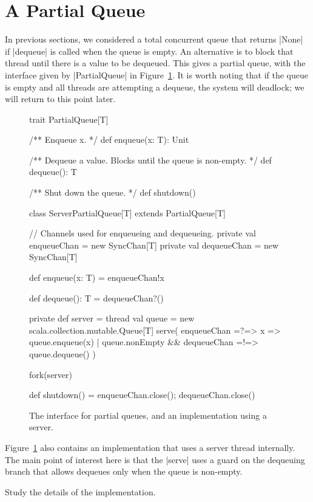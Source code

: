 \section{A Partial Queue}

In previous sections, we considered a total concurrent queue that returns
|None| if |dequeue| is called when the queue is empty.  
%
An alternative is to block that thread until there is a value to be dequeued.
This gives a partial queue, with the interface given by |PartialQueue| in
Figure~\ref{fig:partial-queue}.  It is worth noting that if the queue is empty
and all threads are attempting a dequeue, the system will deadlock; we will
return to this point later.


\begin{figure}
\begin{scala}
trait PartialQueue[T]{
  /** Enqueue x. */
  def enqueue(x: T): Unit

  /** Dequeue a value.  Blocks until the queue is non-empty. */
  def dequeue(): T

  /** Shut down the queue. */
  def shutdown()
}

class ServerPartialQueue[T] extends PartialQueue[T]{
  // Channels used for enqueueing and dequeueing.
  private val enqueueChan = new SyncChan[T]
  private val dequeueChan = new SyncChan[T]

  def enqueue(x: T) = enqueueChan!x

  def dequeue(): T = dequeueChan?()

  private def server = thread{
    val queue = new scala.collection.mutable.Queue[T]
    serve(
      enqueueChan =?=> { x => queue.enqueue(x) }
      | queue.nonEmpty && dequeueChan =!=> queue.dequeue()
    )
  }

  fork(server)

  def shutdown() = { enqueueChan.close(); dequeueChan.close() }
}
\end{scala}
\caption{The interface for partial queues, and an implementation using a
  server.}
\label{fig:partial-queue}
\end{figure}


Figure~\ref{fig:partial-queue} also contains an implementation that uses a
server thread internally.  The main point of interest here is that the |serve|
uses a guard on the dequeuing branch that allows dequeues only when the queue
is non-empty. 

\begin{instruction}
Study the details of the implementation.
\end{instruction}

